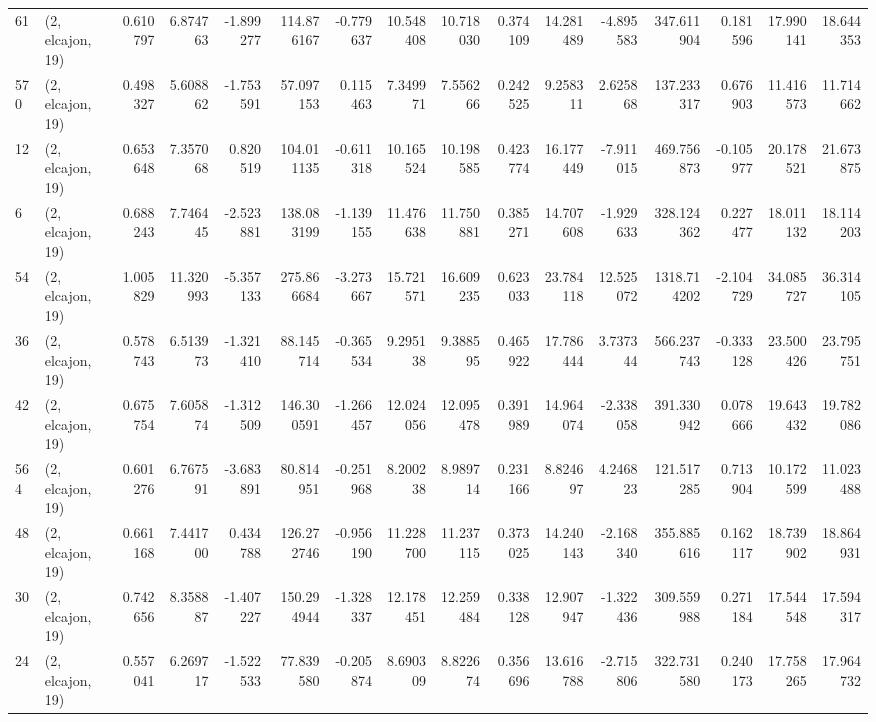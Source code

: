 \begin{tabular}{llrrrrrrrrrrrrrr}
61  &  (2, elcajon, 19) &   0.610797 &   6.874763 &  -1.899277 &   114.876167 &  -0.779637 &  10.548408 &  10.718030 &  0.374109 &  14.281489 &  -4.895583 &    347.611904 &   0.181596 &   17.990141 &   18.644353 \\
570 &  (2, elcajon, 19) &   0.498327 &   5.608862 &  -1.753591 &    57.097153 &   0.115463 &   7.349971 &   7.556266 &  0.242525 &   9.258311 &   2.625868 &    137.233317 &   0.676903 &   11.416573 &   11.714662 \\
12  &  (2, elcajon, 19) &   0.653648 &   7.357068 &   0.820519 &   104.011135 &  -0.611318 &  10.165524 &  10.198585 &  0.423774 &  16.177449 &  -7.911015 &    469.756873 &  -0.105977 &   20.178521 &   21.673875 \\
6   &  (2, elcajon, 19) &   0.688243 &   7.746445 &  -2.523881 &   138.083199 &  -1.139155 &  11.476638 &  11.750881 &  0.385271 &  14.707608 &  -1.929633 &    328.124362 &   0.227477 &   18.011132 &   18.114203 \\
54  &  (2, elcajon, 19) &   1.005829 &  11.320993 &  -5.357133 &   275.866684 &  -3.273667 &  15.721571 &  16.609235 &  0.623033 &  23.784118 &  12.525072 &   1318.714202 &  -2.104729 &   34.085727 &   36.314105 \\
36  &  (2, elcajon, 19) &   0.578743 &   6.513973 &  -1.321410 &    88.145714 &  -0.365534 &   9.295138 &   9.388595 &  0.465922 &  17.786444 &   3.737344 &    566.237743 &  -0.333128 &   23.500426 &   23.795751 \\
42  &  (2, elcajon, 19) &   0.675754 &   7.605874 &  -1.312509 &   146.300591 &  -1.266457 &  12.024056 &  12.095478 &  0.391989 &  14.964074 &  -2.338058 &    391.330942 &   0.078666 &   19.643432 &   19.782086 \\
564 &  (2, elcajon, 19) &   0.601276 &   6.767591 &  -3.683891 &    80.814951 &  -0.251968 &   8.200238 &   8.989714 &  0.231166 &   8.824697 &   4.246823 &    121.517285 &   0.713904 &   10.172599 &   11.023488 \\
48  &  (2, elcajon, 19) &   0.661168 &   7.441700 &   0.434788 &   126.272746 &  -0.956190 &  11.228700 &  11.237115 &  0.373025 &  14.240143 &  -2.168340 &    355.885616 &   0.162117 &   18.739902 &   18.864931 \\
30  &  (2, elcajon, 19) &   0.742656 &   8.358887 &  -1.407227 &   150.294944 &  -1.328337 &  12.178451 &  12.259484 &  0.338128 &  12.907947 &  -1.322436 &    309.559988 &   0.271184 &   17.544548 &   17.594317 \\
24  &  (2, elcajon, 19) &   0.557041 &   6.269717 &  -1.522533 &    77.839580 &  -0.205874 &   8.690309 &   8.822674 &  0.356696 &  13.616788 &  -2.715806 &    322.731580 &   0.240173 &   17.758265 &   17.964732 \\

\end{tabular}
